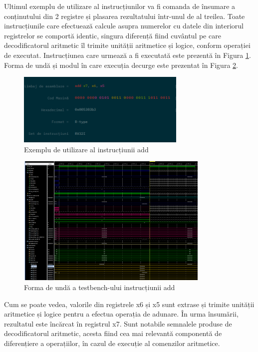 \documentclass[12pt]{article}
\begin{document}
Ultimul exemplu de utilizare al instrucțiunilor va fi comanda de însumare a conținutului din 2 registre și plasarea rezultatului într-unul de al treilea. Toate instrucțiunile care efectuează calcule asupra numerelor cu datele din interiorul registrelor se comportă identic, singura diferență fiind cuvântul pe care decodificatorul aritmetic îl trimite unității aritmetice și logice, conform operației de executat. Instrucțiunea care urmează a fi executată este prezentă în Figura \ref{Figura:69}. Forma de undă și modul în care execuția decurge este prezentat în Figura \ref{Figura:70}.

   \begin{figure}[h!]
 \hspace*{-0.1cm}\includegraphics[width=0.72\textwidth]{rtype.png}
 \centering
 \caption{Exemplu de utilizare al instrucțiunii add}
 \label{Figura:69}
 \end{figure}

 \begin{figure}[h!]
 \hspace*{-0.1cm}\includegraphics[width=0.82\textwidth]{addexample.png}
 \centering
 \caption{Forma de undă a testbench-ului instrucțiunii add}
 \label{Figura:70}
 \end{figure}

Cum se poate vedea, valorile din registrele x6 și x5 sunt extrase și trimite unității aritmetice și logice pentru a efectua operația de adunare. În urma însumării, rezultatul este încărcat în registrul x7. Sunt notabile semnalele produse de decodificatorul aritmetic, acesta fiind cea mai relevantă componentă de diferențiere a operațiilor, în cazul de execuție al comenzilor aritmetice.
\end{document}
